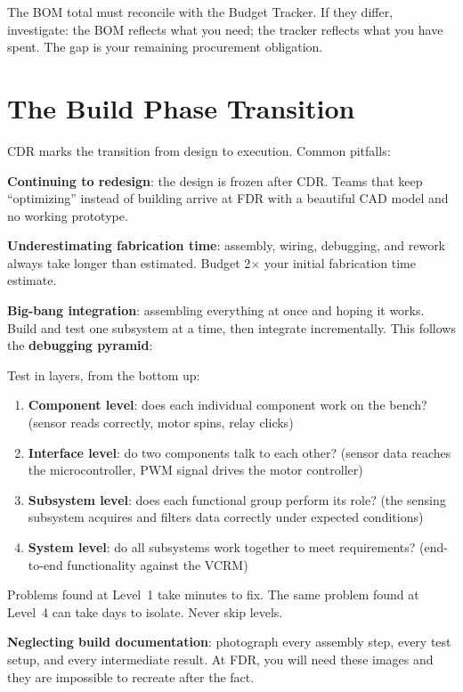 The BOM total must reconcile with the Budget Tracker. If they differ, investigate: the BOM reflects what you need; the tracker reflects what you have spent. The gap is your remaining procurement obligation.

\section{The Build Phase Transition}
CDR marks the transition from design to execution. Common pitfalls:

\textbf{Continuing to redesign}: the design is frozen after CDR. Teams that keep ``optimizing'' instead of building arrive at FDR with a beautiful CAD model and no working prototype.

\textbf{Underestimating fabrication time}: assembly, wiring, debugging, and rework always take longer than estimated. Budget 2$\times$ your initial fabrication time estimate.

\textbf{Big-bang integration}: assembling everything at once and hoping it works. Build and test one subsystem at a time, then integrate incrementally. This follows the \textbf{debugging pyramid}:

\begin{tipbox}
Test in layers, from the bottom up:
\begin{enumerate}[nosep,leftmargin=1.5em]
\item \textbf{Component level}: does each individual component work on the bench? (sensor reads correctly, motor spins, relay clicks)
\item \textbf{Interface level}: do two components talk to each other? (sensor data reaches the microcontroller, PWM signal drives the motor controller)
\item \textbf{Subsystem level}: does each functional group perform its role? (the sensing subsystem acquires and filters data correctly under expected conditions)
\item \textbf{System level}: do all subsystems work together to meet requirements? (end-to-end functionality against the VCRM)
\end{enumerate}
Problems found at Level~1 take minutes to fix. The same problem found at Level~4 can take days to isolate. Never skip levels.
\end{tipbox}

\textbf{Neglecting build documentation}: photograph every assembly step, every test setup, and every intermediate result. At FDR, you will need these images and they are impossible to recreate after the fact.


